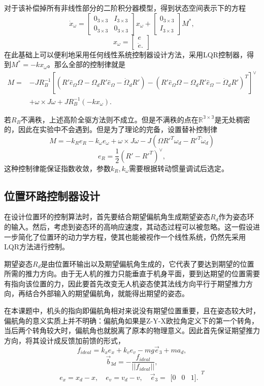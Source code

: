  对于该补偿掉所有非线性部分的二阶积分器模型，得到状态空间表示下的方程
    $$\dot x_\omega=\begin{bmatrix}
        0_{3\times 3} & I_{3\times 3} \\
        0_{3\times 3} & 0_{3\times 3}
    \end{bmatrix} x_\omega+\begin{bmatrix}
        0_{3\times 3} \\ I_{3\times 3}
    \end{bmatrix} M^* ,$$
    $$x_\omega=\begin{bmatrix}
        e \\ \dot e.
    \end{bmatrix}$$
在此基础上可以便利地采用任何线性系统控制器设计方法，采用LQR控制器，得到$M^*=-kx_\omega$。那么全部的控制律就是
   $$ \begin{aligned}
        M=&-J R_B^{-1} [(R' \hat e_\Omega \Omega  -\Omega_d R' \hat e_\Omega -\dot \Omega_d R')-(R' \hat e_\Omega \Omega  -\Omega_d R' \hat e_\Omega -\dot \Omega_d R')^T]^\vee \\
         &+\omega \times J\omega + J R_B^{-1}(-kx_\omega).
    \end{aligned}$$

    若$R_B$不满秩，上述高阶全驱方法则不成立。但是不满秩的点在$\mathbb{R^{3 \times 3}}$是无处稠密的，因此在实验中不会遇到。但是为了理论的完备，设置替补控制律\cite{Lee2010}
    $$M=-k_R e_R-k_\omega e_\omega+\omega \times J \omega -J(\Omega R'^T \omega_d-R'^T \dot \omega_d) $$
    $$ e_R=\frac{1}{2} (R'-R'^T)^\vee ,$$
    这种控制律能保证指数收敛，参数$k_R,k_\omega$需要根据转动惯量调试后选定。
    \subsection*{位置环路控制器设计}
    在设计位置环的控制算法时，首先要结合期望偏航角生成期望姿态$R_d$作为姿态环的输入。然后，考虑到姿态环的高响应速度，其动态过程可以被忽略。这一假设进一步简化了位置环的动力学方程，使其也能被视作一个线性系统，仍然先采用LQR方法进行控制。

    期望姿态$R_d$是由位置环输出以及期望偏航角生成的，它代表了要达到期望的位置所需的推力方向。由于无人机的推力只能垂直于机身平面，要到达期望的位置需要有指向该位置的力，因此要首先改变无人机姿态使其法线方向平行于期望推力方向，再结合外部输入的期望偏航角，就能得出期望的姿态\cite{Lee2010}。

    在本课题中，机头的指向即偏航角相对来说没有期望位置重要，且在姿态较大时，偏航角的意义实质上并不明确：偏航角如果是Z-Y-X欧拉角定义下的第一个转角，当后两个转角较大时，偏航角也就脱离了原本的物理意义。因此首先保证期望推力方向，将其设计成反馈加前馈的形式，
    $$f_{ideal}=k_x e_x+k_v e_v-mg \vec e_3+m a_d,$$
    $$\vec b_{3d}=-\frac{f_{ideal}}{||f_{ideal}||},$$
    $$ e_x=x_d-x ,\quad e_v=v_d-v ,\quad \vec e_3=\begin{matrix}
        [0 & 0 & 1].
    \end{matrix}^T$$

